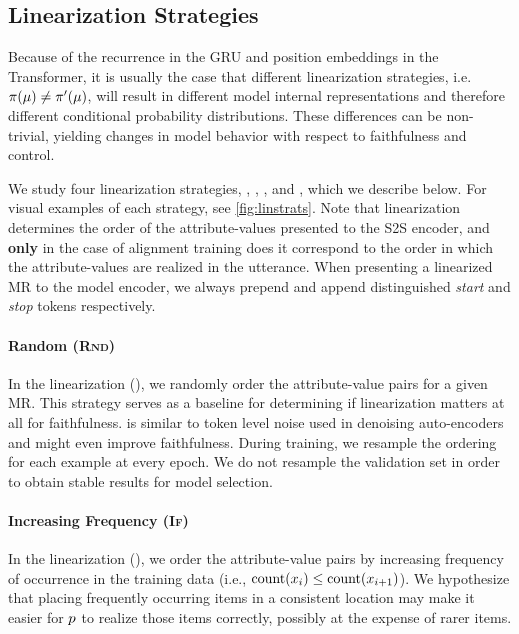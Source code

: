 \subsection{Linearization Strategies}
\label{sec:linstrats}

Because of the recurrence in the GRU and position embeddings in the
Transformer, it is usually the case that different linearization
strategies, i.e.  $\pi(\mu) \ne \pi^\prime(\mu)$, will result in different
model internal representations and therefore different conditional probability
distributions. These differences can be non-trivial, yielding changes in model
behavior with respect to faithfulness and control.

We study four linearization strategies, , , , and , which we describe below. For visual examples of each
strategy, see \autoref{fig:linstrats}.  Note that linearization determines the
order of the attribute-values presented to the S2S encoder, and \textbf{only} in the
case of alignment training does it correspond to the order in which the
attribute-values are realized in the utterance. When presenting a linearized
MR to the model encoder, we always prepend and append distinguished
\textit{start} and \textit{stop} tokens respectively.



\paragraph{Random (\textsc{Rnd})} In the  linearization
(), we randomly order the attribute-value pairs for a given MR.
This strategy serves as a baseline for determining if linearization 
matters at all for faithfulness.  is similar to token level noise
used in denoising auto-encoders \cite{wang2019} and might
even improve faithfulness.  During training, we resample the ordering for each
example at every epoch.  We do not resample the validation set in order to
obtain stable results for model selection.

\paragraph{Increasing Frequency (\textsc{If})} In the  linearization (), we order the attribute-value pairs by
increasing frequency of occurrence in the training data (i.e., $\operatorname{count}(x_i)
\le \operatorname{count}(x_{i+1})$).  We hypothesize that placing frequently occurring
items in a consistent location may make it easier for $p$ to realize
those items correctly, possibly at the expense of rarer items.

